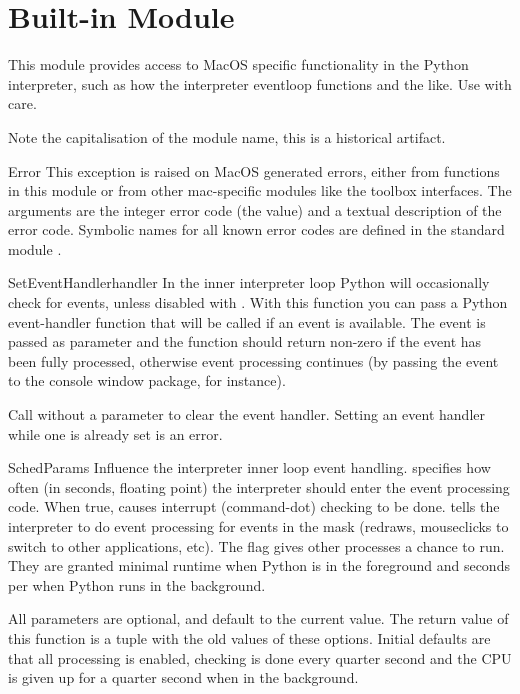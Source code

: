 \section{Built-in Module }
\label{module-MacOS}


This module provides access to MacOS specific functionality in the
Python interpreter, such as how the interpreter eventloop functions
and the like. Use with care.

Note the capitalisation of the module name, this is a historical
artifact.

\begin{excdesc}{Error}
This exception is raised on MacOS generated errors, either from
functions in this module or from other mac-specific modules like the
toolbox interfaces. The arguments are the integer error code (the
 value) and a textual description of the error code.
Symbolic names for all known error codes are defined in the standard
module .
\end{excdesc}

\begin{funcdesc}{SetEventHandler}{handler}
In the inner interpreter loop Python will occasionally check for events,
unless disabled with . With this function you
can pass a Python event-handler function that will be called if an event
is available. The event is passed as parameter and the function should return
non-zero if the event has been fully processed, otherwise event processing
continues (by passing the event to the console window package, for instance).

Call  without a parameter to clear the
event handler. Setting an event handler while one is already set is an
error.
\end{funcdesc}

\begin{funcdesc}{SchedParams}{}
Influence the interpreter inner loop event handling. 
specifies how often (in seconds, floating point) the interpreter
should enter the event processing code. When true,  causes
interrupt (command-dot) checking to be done.  tells the
interpreter to do event processing for events in the mask (redraws,
mouseclicks to switch to other applications, etc). The 
flag gives other processes a chance to run. They are granted minimal
runtime when Python is in the foreground and  seconds per
 when Python runs in the background.

All parameters are optional, and default to the current value. The return
value of this function is a tuple with the old values of these options.
Initial defaults are that all processing is enabled, checking is done every
quarter second and the CPU is given up for a quarter second when in the
background.
\end{funcdesc}

